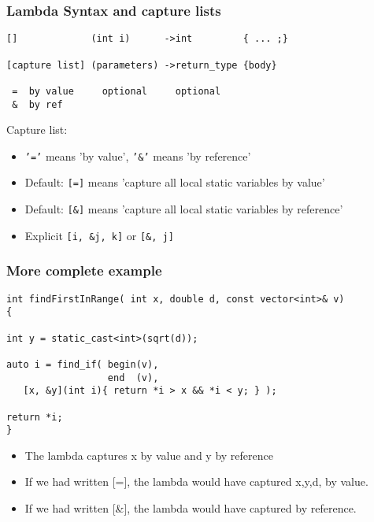 \begin{frame}[fragile,t]
\frametitle{Lambda Syntax and capture lists}

{\scriptsize
\begin{verbatim}
[]             (int i)      ->int         { ... ;}

[capture list] (parameters) ->return_type {body} 

 =  by value     optional     optional
 &  by ref      
\end{verbatim}
}

Capture list:
\begin{itemize}
\item \texttt{'='} means 'by value',  \texttt{'\&'} means 'by reference'
\item Default:  \texttt{[=]} means 'capture all local static variables by value' 
\item Default:  \texttt{[\&]} means 'capture all local static variables by reference' 
\item Explicit \texttt{[i, \&j, k]}  or \texttt{[\&, j]}  
\end{itemize}

\end{frame}

\begin{frame}[fragile,t]
\frametitle{More complete example}

{\scriptsize
\begin{verbatim}
int findFirstInRange( int x, double d, const vector<int>& v)
{

int y = static_cast<int>(sqrt(d));

auto i = find_if( begin(v), 
                  end  (v), 
   [x, &y](int i){ return *i > x && *i < y; } );

return *i;
}
\end{verbatim}
}
\pause

\begin{itemize}
\item The lambda captures x by value and y by reference
\item If we had written [=], the lambda would have captured x,y,d,
   by value.
\item If we had written [\&], the lambda would have captured by
  reference.
\end{itemize}

\end{frame}



